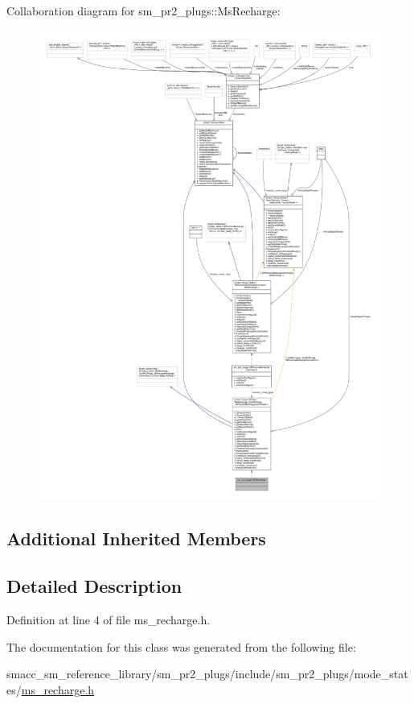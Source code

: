 Collaboration diagram for sm\+\_\+pr2\+\_\+plugs\+:\+:Ms\+Recharge\+:
\nopagebreak
\begin{figure}[H]
\begin{center}
\leavevmode
\includegraphics[width=350pt]{classsm__pr2__plugs_1_1MsRecharge__coll__graph}
\end{center}
\end{figure}
\subsection*{Additional Inherited Members}


\subsection{Detailed Description}


Definition at line 4 of file ms\+\_\+recharge.\+h.



The documentation for this class was generated from the following file\+:\begin{DoxyCompactItemize}
\item 
smacc\+\_\+sm\+\_\+reference\+\_\+library/sm\+\_\+pr2\+\_\+plugs/include/sm\+\_\+pr2\+\_\+plugs/mode\+\_\+states/\hyperlink{ms__recharge_8h}{ms\+\_\+recharge.\+h}\end{DoxyCompactItemize}
